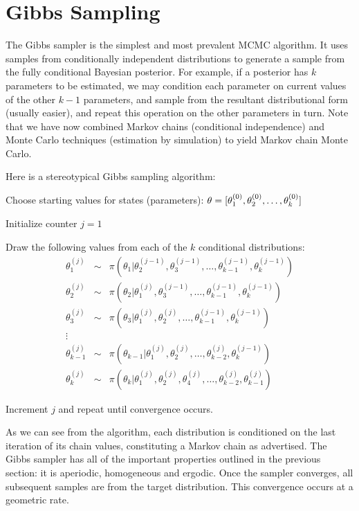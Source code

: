 \documentclass[]{book}
\begin{document}
\section{Gibbs Sampling}

The Gibbs sampler is the simplest and most prevalent MCMC algorithm. It uses samples from conditionally independent distributions to generate a sample from the fully conditional Bayesian posterior. For example, if a posterior has $k$ parameters to be estimated, we may condition each parameter on current values of the other $k-1$ parameters, and sample from the resultant distributional form (usually easier), and repeat this operation on the other parameters in turn. Note that we have now combined Markov chains (conditional independence) and Monte Carlo techniques (estimation by simulation) to yield Markov chain Monte Carlo.

Here is a stereotypical Gibbs sampling algorithm:

\begin{list}{}
{}
\item Choose starting values for states (parameters): ${\bf \theta} = [\theta_1^{(0)},\theta_2^{(0)},\ldots,\theta_k^{(0)}]$
\item Initialize counter $j=1$
\item Draw the following values from each of the $k$ conditional distributions:
\begin{eqnarray*}
\theta_1^{(j)} &\sim& \pi(\theta_1 | \theta_2^{(j-1)},\theta_3^{(j-1)},\ldots,\theta_{k-1}^{(j-1)},\theta_k^{(j-1)}) \\
\theta_2^{(j)} &\sim& \pi(\theta_2 | \theta_1^{(j)},\theta_3^{(j-1)},\ldots,\theta_{k-1}^{(j-1)},\theta_k^{(j-1)}) \\
\theta_3^{(j)} &\sim& \pi(\theta_3 | \theta_1^{(j)},\theta_2^{(j)},\ldots,\theta_{k-1}^{(j-1)},\theta_k^{(j-1)}) \\
\vdots \\
\theta_{k-1}^{(j)} &\sim& \pi(\theta_{k-1} | \theta_1^{(j)},\theta_2^{(j)},\ldots,\theta_{k-2}^{(j)},\theta_k^{(j-1)}) \\
\theta_k^{(j)} &\sim& \pi(\theta_k | \theta_1^{(j)},\theta_2^{(j)},\theta_4^{(j)},\ldots,\theta_{k-2}^{(j)},\theta_{k-1}^{(j)})
\end{eqnarray*}
\item Increment $j$ and repeat until convergence occurs.
\end{list}

As we can see from the algorithm, each distribution is conditioned on the last iteration of its chain values, constituting a Markov chain as advertised. The Gibbs sampler has all of the important properties outlined in the previous section: it is aperiodic, homogeneous and ergodic. Once the sampler converges, all subsequent samples are from the target distribution. This convergence occurs at a geometric rate.
\end{document}

